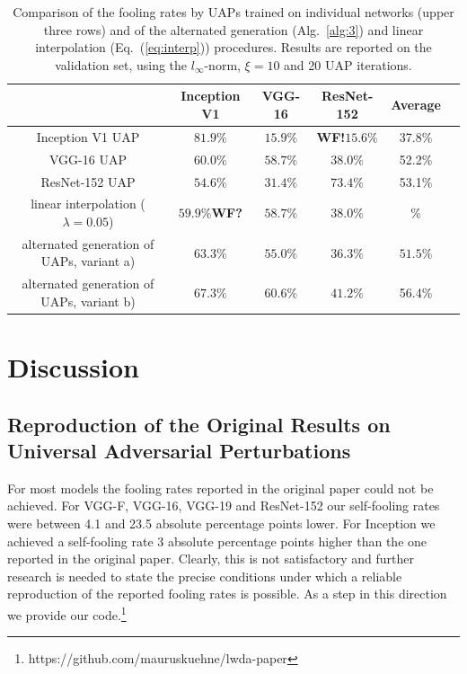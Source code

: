 \documentclass[runningheads]{llncs}
\begin{document}
\begin{table}
\centering

\begin{tabular}{|c|c|c|c|c|c|}
\hline
											&	Inception	V1&	VGG-16		&	ResNet-152	& Average	\\ \hline
Inception V1 UAP							&	\(81.9\%\)		&	\(15.9\%\)	&	{\bf WF!}\(15.6\%\)	&37.8\%	\\
VGG-16 UAP								&	\(60.0\%\)		&	\(58.7\%\)	&	\(38.0\%\)	&52.2\%	\\
ResNet-152 UAP &	\(54.6\%\)		&	\(31.4\%\)	&	\(73.4\%\)&53.1\%		\\ \hline
linear interpolation (\(\lambda=0.05\))	&	\(59.9\%\){\bf WF?}		&	\(58.7\%\)	&	\(38.0\%\)	&\%\\
alternated generation of UAPs, variant a)&	\(63.3\%\)		&	\(55.0\%\)	&	\(36.3\%\)	& \(51.5\%\)	\\
alternated generation of UAPs, variant b)&	\(67.3\%\)		&	\(60.6\%\)	&	\(41.2\%\)		&56.4\%\\


\hline 
\end{tabular}

\caption{Comparison of the fooling rates by UAPs trained on individual networks (upper three rows) and of the alternated generation  (Alg.~\ref{alg:3}) and linear interpolation (Eq.~(\ref{eq:interp})) procedures. Results are reported on the validation set, using the $l_\infty$-norm, $\xi=10$ and 20 UAP iterations.}\label{tab:vergleich_comb}
\end{table}


\section{Discussion}
\subsection{Reproduction of the Original Results on Universal Adversarial Perturbations}
For most models the fooling rates reported in the original paper could not be achieved. For VGG-F, VGG-16, VGG-19 and ResNet-152 our  self-fooling rates were between 4.1 and 23.5 absolute percentage points lower. For Inception we achieved a self-fooling rate 3 absolute percentage points higher than the one reported in the original paper. Clearly, this is not satisfactory and further research is needed to state the precise conditions under which a reliable reproduction of the reported fooling rates is possible. As a step in this direction we provide our code.\footnote{https://github.com/mauruskuehne/lwda-paper}
\end{document}
